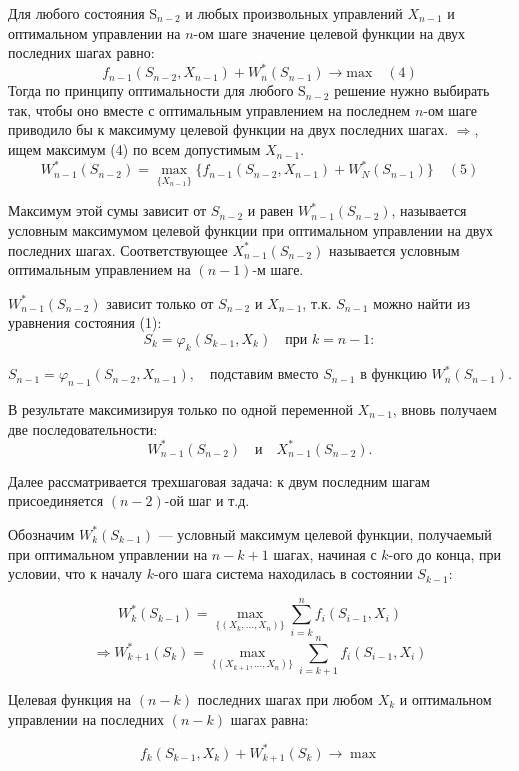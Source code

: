 \documentclass[17pt]{extarticle}
\begin{document}
Для любого состояния \( \text{S}_{n-2} \) и любых произвольных управлений \( X_{n-1} \)
и оптимальном управлении на \( n \)-ом шаге значение целевой функции на двух последних шагах равно:
\[
    f_{n-1}(S_{n-2}, X_{n-1}) + W_n^*(S_{n-1}) \rightarrow \text{max} \quad (4)
\]
Тогда по принципу оптимальности для любого \( \text{S}_{n-2} \) решение нужно выбирать так,
чтобы оно вместе с оптимальным управлением на последнем \( n \)-ом шаге приводило бы к максимуму целевой функции на двух последних шагах.
$\Rightarrow$, ищем максимум (4) по всем допустимым $X_{n-1}$.
\[
    W_{n-1}^*(S_{n-2})=\max_{\{X_{n-1}\}}\{f_{n-1}(S_{n-2}, X_{n-1}) + W_N^*(S_{n-1})\} \quad (5)
\]

Максимум этой сумы зависит от $S_{n-2}$ и равен $W_{n-1}^*(S_{n-2})$,
называется \\ условным максимумом целевой функции при оптимальном управлении на двух последних шагах.
Соответствующее $X_{n-1}^*(S_{n-2})$ называется условным оптимальным управлением на $(n-1)$-м шаге.

\( W_{n-1}^*(S_{n-2}) \) зависит только от \( S_{n-2} \) и \( X_{n-1} \), т.к. \( S_{n-1} \) можно найти из уравнения состояния (1):
\[
    S_k = \varphi_k(S_{k-1}, X_k) \quad \text{при } k = n-1:
\]

\[
    S_{n-1} = \varphi_{n-1}(S_{n-2}, X_{n-1}), \quad \text{подставим вместо } S_{n-1} \text{ в функцию } W_n^*(S_{n-1}).
\]

В результате максимизируя только по одной переменной \( X_{n-1} \), вновь получаем две последовательности:
\[
    W_{n-1}^*(S_{n-2}) \quad \text{и} \quad X_{n-1}^*(S_{n-2}).
\]

Далее рассматривается трехшаговая задача: к двум последним шагам присоединяется \( (n-2) \)-ой шаг и т.д.

Обозначим \( W_k^*(S_{k-1}) \) — условный максимум целевой функции,
получаемый при оптимальном управлении на \( n - k + 1 \) шагах, начиная с \( k \)-ого до конца, при условии,
что к началу \( k \)-ого шага система находилась в состоянии \( S_{k-1} \):

\[
    W_k^*(S_{k-1}) = \max_{\{(X_k, \ldots, X_n)\}} \sum_{i=k}^n f_i(S_{i-1}, X_i)
\]
\[
    \Rightarrow W_{k+1}^*(S_k) = \max_{\{(X_{k+1}, \ldots, X_n)\}} \sum_{i=k+1}^n f_i(S_{i-1}, X_i)
\]

Целевая функция на \( (n - k) \) последних шагах при любом \( X_k \) и оптимальном управлении на последних \( (n - k) \) шагах равна:

\[
    f_k(S_{k-1}, X_k) + W_{k+1}^*(S_k) \rightarrow \max
\]
\end{document}
